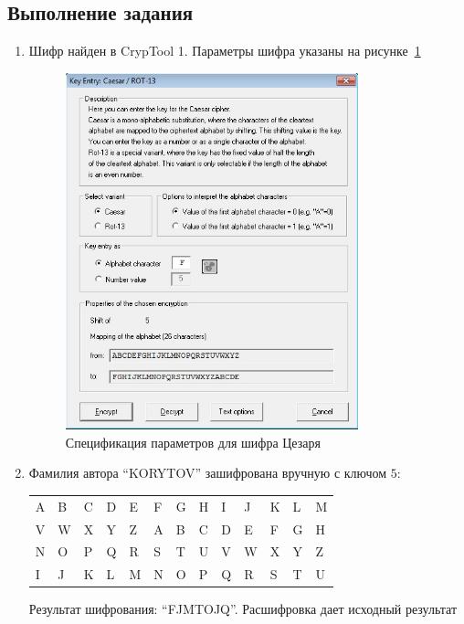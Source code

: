 \documentclass[a4paper, 14pt]{extarticle}
\begin{document}
\subsection{Выполнение задания}
\begin{enumerate}
    \item Шифр найден в CrypTool 1. Параметры шифра указаны на рисунке~\ref{img:caesar:0}
    \begin{figure}[h]
        \centering
        \includegraphics[width=0.8\textwidth]{img/S011.jpg}
        \caption{Спецификация параметров для шифра Цезаря}%
        \label{img:caesar:0}
    \end{figure}
    \item Фамилия автора ``KORYTOV'' зашифрована вручную с ключом $5$:\\
    \begin{tabular}{lllllllllllll}
    A & B & C & D & E & F & G & H & I & J & K & L & M \\
    V & W & X & Y & Z & A & B & C & D & E & F & G & H \\ \hline
    N & O & P & Q & R & S & T & U & V & W & X & Y & Z \\
    I & J & K & L & M & N & O & P & Q & R & S & T & U
    \end{tabular}

    Результат шифрования: ``FJMTOJQ''. Расшифровка дает исходный результат
    

\end{enumerate}
\end{document}
